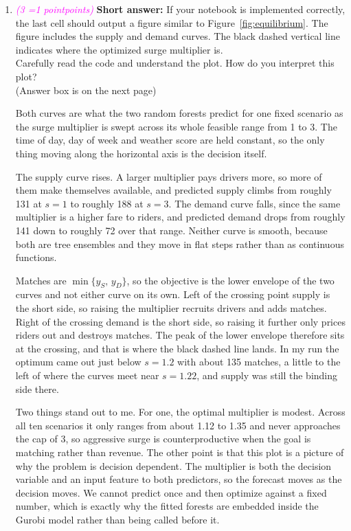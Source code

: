 \documentclass[11pt, letter, answers]{exam}
\newcommand{\grade}[1]{
    \small\textcolor{magenta}{\emph{(#1 \ifnum#1=1 point\else points\fi)}}%
    \normalsize
}
\newcommand{\saq}{\textbf{Short answer: }}
\begin{document}
\begin{enumerate}[label=(\alph*)]

\item \grade{3} \saq If your notebook is implemented correctly, the last cell should output a figure similar to Figure~\ref{fig:equilibrium}. The figure includes the supply and demand curves. The black dashed vertical line indicates where the optimized surge multiplier is. 
\\Carefully read the code and understand the plot. How do you interpret this plot?
\\(Answer box is on the next page)

\newpage
\begin{answerBox}[height=6in]
Both curves are what the two random forests predict for one fixed scenario as the surge multiplier is swept across its whole feasible range from 1 to 3. The time of day, day of week and weather score are held constant, so the only thing moving along the horizontal axis is the decision itself.

The supply curve rises. A larger multiplier pays drivers more, so more of them make themselves available, and predicted supply climbs from roughly 131 at $s=1$ to roughly 188 at $s=3$. The demand curve falls, since the same multiplier is a higher fare to riders, and predicted demand drops from roughly 141 down to roughly 72 over that range. Neither curve is smooth, because both are tree ensembles and they move in flat steps rather than as continuous functions.

Matches are $\min\{y_S,\, y_D\}$, so the objective is the lower envelope of the two curves and not either curve on its own. Left of the crossing point supply is the short side, so raising the multiplier recruits drivers and adds matches. Right of the crossing demand is the short side, so raising it further only prices riders out and destroys matches. The peak of the lower envelope therefore sits at the crossing, and that is where the black dashed line lands. In my run the optimum came out just below $s = 1.2$ with about 135 matches, a little to the left of where the curves meet near $s = 1.22$, and supply was still the binding side there.

Two things stand out to me. For one, the optimal multiplier is modest. Across all ten scenarios it only ranges from about 1.12 to 1.35 and never approaches the cap of 3, so aggressive surge is counterproductive when the goal is matching rather than revenue. The other point is that this plot is a picture of why the problem is decision dependent. The multiplier is both the decision variable and an input feature to both predictors, so the forecast moves as the decision moves. We cannot predict once and then optimize against a fixed number, which is exactly why the fitted forests are embedded inside the Gurobi model rather than being called before it.
\end{answerBox}

\end{enumerate}
\end{document}
